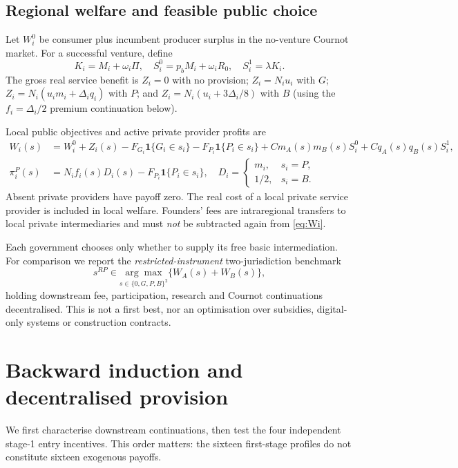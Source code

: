 \documentclass[11pt]{article}
\begin{document}
\subsection{Regional welfare and feasible public choice}\label{sec:accounts}
Let $W_i^0$ be consumer plus incumbent producer surplus in the no-venture Cournot market. For a successful venture, define
\begin{equation}
 K_i=M_i+\omega_i\Pi,\quad
 S_i^0=p_b M_i+\omega_iR_0,\quad
 S_i^1=\lambda K_i.
 \label{eq:KSi}
\end{equation}
The gross real service benefit is $Z_i=0$ with no provision; $Z_i=N_iu_i$ with $G$; $Z_i=N_i(u_i m_i+\Delta_iq_i)$ with $P$; and $Z_i=N_i(u_i+3\Delta_i/8)$ with $B$ (using the $f_i=\Delta_i/2$ premium continuation below).

Local public objectives and active private provider profits are
\begin{align}
 W_i(s)&=W_i^0+Z_i(s)
       -F_{G_i}\mathbf1\{G_i\in s_i\}
       -F_{P_i}\mathbf1\{P_i\in s_i\}
       +Cm_A(s)m_B(s)S_i^0+Cq_A(s)q_B(s)S_i^1,
       \label{eq:Wi}\\
 \pi_i^P(s)&=N_if_i(s)D_i(s)-F_{P_i}\mathbf1\{P_i\in s_i\},
 \quad D_i=\begin{cases}m_i,&s_i=P,\\1/2,&s_i=B.\end{cases}
 \label{eq:privateprofit}
\end{align}
Absent private providers have payoff zero. The real cost of a local private service provider is included in local welfare. Founders' fees are intraregional transfers to local private intermediaries and must \emph{not} be subtracted again from \eqref{eq:Wi}.

Each government chooses only whether to supply its free basic intermediation. For comparison we report the \emph{restricted-instrument} two-jurisdiction benchmark
\begin{equation}
 s^{RP}\in\underset{s\in\{0,G,P,B\}^2}{\arg\max}
       \{W_A(s)+W_B(s)\},
 \label{eq:planner}
\end{equation}
holding downstream fee, participation, research and Cournot continuations decentralised. This is not a first best, nor an optimisation over subsidies, digital-only systems or construction contracts.

\section{Backward induction and decentralised provision}\label{sec:equilibrium}
We first characterise downstream continuations, then test the four independent stage-1 entry incentives. This order matters: the sixteen first-stage profiles do not constitute sixteen exogenous payoffs.
\end{document}

